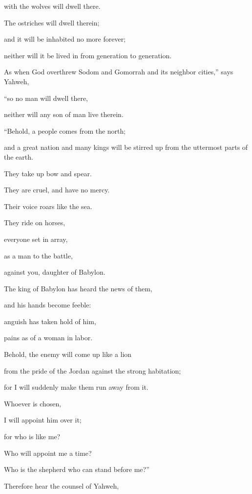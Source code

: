 {\par }{\QB with the wolves will dwell there.
\par }{\Q The ostriches will dwell therein;
\par }{\QB and it will be inhabited no more forever;
\par }{\QB neither will it be lived in from generation to generation.
\par }{\Q {}As when God overthrew Sodom and Gomorrah and its neighbor cities,” says Yahweh,
\par }{\QB “so no man will dwell there,
\par }{\QB neither will any son of man live therein.
\par }{\BB \par }{\Q {}“Behold, a people comes from the north;
\par }{\QB and a great nation and many kings will be stirred up from the uttermost parts of the earth.
\par }{\Q {}They take up bow and spear.
\par }{\QB They are cruel, and have no mercy.
\par }{\QB Their voice roars like the sea.
\par }{\Q They ride on horses,
\par }{\QB everyone set in array,
\par }{\QB as a man to the battle,
\par }{\QB against you, daughter of Babylon.
\par }{\Q {}The king of Babylon has heard the news of them,
\par }{\QB and his hands become feeble:
\par }{\Q anguish has taken hold of him,
\par }{\QB pains as of a woman in labor.
\par }{\Q {}Behold, the enemy will come up like a lion
\par }{\QB from the pride of the Jordan against the strong habitation;
\par }{\QB for I will suddenly make them run away from it.
\par }{\Q Whoever is chosen,
\par }{\QB I will appoint him over it;
\par }{\QB for who is like me?
\par }{\Q Who will appoint me a time?
\par }{\QB Who is the shepherd who can stand before me?”
\par }{\Q {}Therefore hear the counsel of Yahweh,
}
